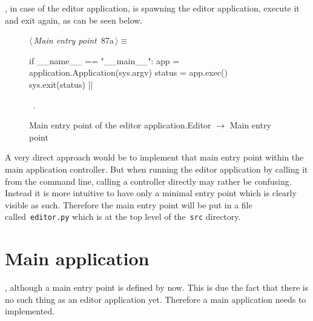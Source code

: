 \documentclass[%
    a4paper,    %
    justified,  %
    nobib,      %
    openany     %
]{tufte-book}
\makeatletter
\renewcommand{\label}[1]{\@tufte@label{##1}}%
\makeatother
\begin{document}
, in case of the editor
application, is spawning the editor application, execute it and exit again, as
can be seen below.

\begin{figure}[!htpb]
  \begin{flushleft} \small
\begin{minipage}{\linewidth}\label{scrap11}\raggedright\small
{} $\langle\,${\itshape Main entry point}\nobreak\ {\footnotesize {87a}}$\,\rangle\equiv$
\vspace{-1ex}
\begin{pythoncode}
if __name__ == "__main__":
    app = application.Application(sys.argv)
    status = app.exec()
    sys.exit(status)
  |\NWsep|
\end{pythoncode}
\vspace{1.5ex}
\footnotesize
\begin{list}{}{\setlength{\itemsep}{-\parsep}\setlength{\itemindent}{-\leftmargin}}
\item \NWtxtMacroRefIn\ .

\item{}
\end{list}
\end{minipage}\vspace{4ex}
\end{flushleft}
\caption{Main entry point of the editor application.\newline{}\newline{}Editor
    $\rightarrow$ Main entry point}
\end{figure}

 A very direct approach
would be to implement that main entry point within the main application
controller. But when running the editor application by calling it from the
command line, calling a controller directly may rather be confusing. Instead it
is more intuitive to have only a minimal entry point which is clearly visible as
such. Therefore the main entry point will be put in a file
called~\verb=editor.py= which is at the top level of the~\verb=src= directory.

\section{Main application}
\label{appendix:sec:editor:app}

, although a main entry
point is defined by now. This is due the fact that there is no such thing as an
editor application yet. Therefore a main application needs to implemented.
\end{document}
